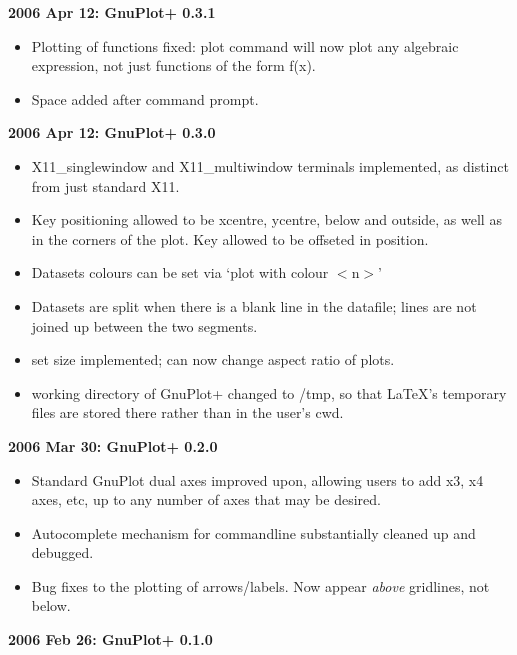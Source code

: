 \documentclass[a4paper,onecolumn,11pt]{book}
\begin{document}
\noindent \textbf{2006 Apr 12: GnuPlot+ 0.3.1}
\begin{itemize}
\item Plotting of functions fixed: plot command will now plot any algebraic
expression, not just functions of the form f(x).
\item Space added after command prompt.
\end{itemize}

\noindent \textbf{2006 Apr 12: GnuPlot+ 0.3.0}
\begin{itemize}
\item X11\_singlewindow and X11\_multiwindow terminals implemented, as distinct
from just standard X11.
\item Key positioning allowed to be xcentre, ycentre, below and outside, as
well as in the corners of the plot. Key allowed to be offseted in position.
\item Datasets colours can be set via `plot with colour $<$n$>$'
\item Datasets are split when there is a blank line in the datafile; lines are
not joined up between the two segments.
\item set size implemented; can now change aspect ratio of plots.
\item working directory of GnuPlot+ changed to /tmp, so that LaTeX's temporary
files are stored there rather than in the user's cwd.
\end{itemize}

\noindent \textbf{2006 Mar 30: GnuPlot+ 0.2.0}
\begin{itemize}
\item Standard GnuPlot dual axes improved upon, allowing users to add x3, x4
axes, etc, up to any number of axes that may be desired.
\item Autocomplete mechanism for commandline substantially cleaned up and
debugged.
\item Bug fixes to the plotting of arrows/labels. Now appear \textit{above} gridlines,
not below.
\end{itemize}

\noindent \textbf{2006 Feb 26: GnuPlot+ 0.1.0}

\printindex
\end{document}
